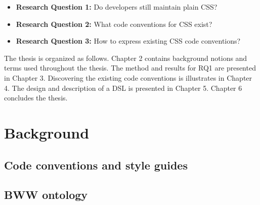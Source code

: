 \documentclass[parskip=full]{uvamscse}
\begin{document}
  \begin{itemize}
    \item \textbf{Research Question 1:} Do developers still maintain plain CSS?
    \item \textbf{Research Question 2:} What code conventions for CSS exist?
    \item \textbf{Research Question 3:} How to express existing CSS code conventions?
  \end{itemize}

The thesis is organized as follows. Chapter 2 contains background notions and terms used throughout
the thesis. The method and results for RQ1 are presented in Chapter 3. Discovering the existing code
conventions is illustrates in Chapter 4. The design and description of a DSL is presented in Chapter
5. Chapter 6 concludes the thesis.



\chapter{Background}

\section{Code conventions and style guides}

\section{BWW ontology}
\end{document}
